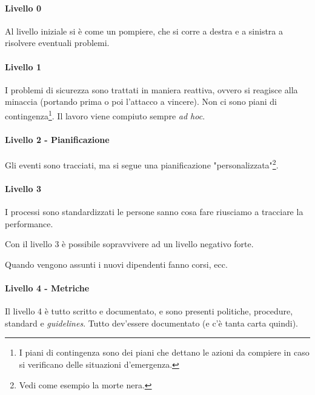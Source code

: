 \paragraph{Livello 0}


Al livello iniziale si è come un pompiere, che si corre a destra e a sinistra a 
risolvere eventuali problemi.

\paragraph{Livello 1}

I problemi di sicurezza sono trattati in maniera reattiva, ovvero si reagisce 
alla minaccia (portando prima o poi l'attacco a vincere). Non ci sono piani di 
contingenza\footnote{I piani di contingenza sono dei piani che dettano le azioni 
da compiere in caso si verificano delle situazioni d'emergenza.}. Il lavoro 
viene compiuto sempre \textit{ad hoc}.

\paragraph{Livello 2 - Pianificazione}

Gli eventi sono tracciati, ma si segue una pianificazione 
"personalizzata"\footnote{Vedi come esempio la morte nera.}.

\paragraph{Livello 3}
I processi sono standardizzati le persone sanno cosa fare riusciamo a tracciare 
la performance. 



Con il livello 3 è possibile sopravvivere ad un livello negativo forte.






Quando vengono assunti i nuovi dipendenti fanno corsi, ecc.








\paragraph{Livello 4 - Metriche}


Il livello 4 è tutto scritto e documentato, e sono presenti politiche, 
procedure, standard e \textit{guidelines}. Tutto dev'essere documentato (e c'è 
tanta carta quindi).



